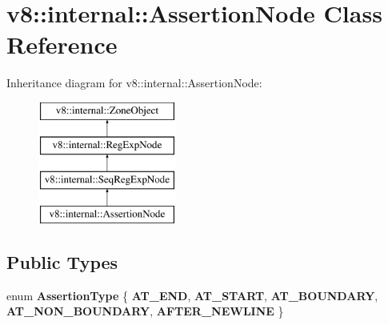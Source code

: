 \hypertarget{classv8_1_1internal_1_1AssertionNode}{}\section{v8\+:\+:internal\+:\+:Assertion\+Node Class Reference}
\label{classv8_1_1internal_1_1AssertionNode}
Inheritance diagram for v8\+:\+:internal\+:\+:Assertion\+Node\+:\begin{figure}[H]
\begin{center}
\leavevmode
\includegraphics[height=4.000000cm]{classv8_1_1internal_1_1AssertionNode}
\end{center}
\end{figure}
\subsection*{Public Types}
\begin{DoxyCompactItemize}
\item 
\mbox{\label{classv8_1_1internal_1_1AssertionNode_aa677ff26097f7ecb13c9283478981035}} 
enum {\bfseries Assertion\+Type} \{ \newline
{\bfseries A\+T\+\_\+\+E\+ND}, 
{\bfseries A\+T\+\_\+\+S\+T\+A\+RT}, 
{\bfseries A\+T\+\_\+\+B\+O\+U\+N\+D\+A\+RY}, 
{\bfseries A\+T\+\_\+\+N\+O\+N\+\_\+\+B\+O\+U\+N\+D\+A\+RY}, 
\newline
{\bfseries A\+F\+T\+E\+R\+\_\+\+N\+E\+W\+L\+I\+NE}
 \}
\end{DoxyCompactItemize}
